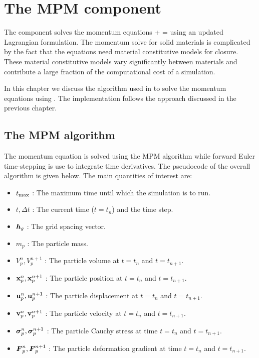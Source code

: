 \chapter{The MPM component}
The \MPM component solves the momentum equations
\Beq
  \Div{\Bsig} + \rho\Bb = \rho\dot{\Bv} 
\Eeq
using an updated Lagrangian formulation. The momentum solve for solid materials is
complicated by the fact that the equations need material constitutive models for
closure.  These material constitutive models vary significantly between materials
and contribute a large fraction of the computational cost of a simulation.

In this chapter we discuss the algorithm used in \Vaango to solve the momentum
equations using \MPM.  The implementation follows the approach discussed in
the previous chapter.

\section{The MPM algorithm}

The momentum equation is solved using the MPM algorithm while forward Euler time-stepping
is use to integrate time derivatives.  The pseudocode of the overall algorithm is given below.
The main quantities of interest are:
\begin{itemize} 
  \setlength\itemsep{1pt}
  \item $t_{\text{max}}$ : {\Ochre The maximum time until which the simulation is to run.}
  \item $t, \Delta t$ : {\Ochre The current time ($t = t_n$) and the time step.}
  \item $\boldsymbol{h}_g$ : {\Ochre The grid spacing vector.}
  \item $m_p$ : {\Ochre The particle mass.}
  \item $V_p^n, V_p^{n+1}$ : {\Ochre The particle volume at $t = t_n$ and $t = t_{n+1}$.}
  \item $\mathbf{x}_p^n, \mathbf{x}_p^{n+1}$ : {\Ochre The particle position at $t = t_n$ and $t = t_{n+1}$.}
  \item $\mathbf{u}_p^n, \mathbf{u}_p^{n+1}$ : {\Ochre The particle displacement at $t = t_n$ and $t = t_{n+1}$.}
  \item $\mathbf{v}_p^n, \mathbf{v}_p^{n+1}$ : {\Ochre The particle velocity at $t = t_n$ and $t = t_{n+1}$.}
  \item $\boldsymbol{\sigma}_p^n, \boldsymbol{\sigma}_p^{n+1}$ : {\Ochre The particle Cauchy stress at time $t = t_n$ and $t = t_{n+1}$.}
  \item $\boldsymbol{F}_p^n, \boldsymbol{F}_p^{n+1}$ : {\Ochre The particle deformation gradient at time $t = t_n$ and $t = t_{n+1}$.}
\end{itemize}

